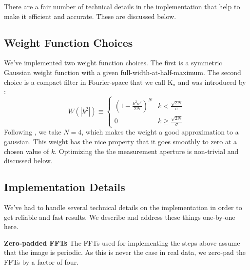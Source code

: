\documentclass[twocolappendix, appendixfloats, numberedappendix, twocolumn, apj]{openjournal}
\newcommand{\ksigma}{\mbox{\boldmath $\mathrm{K}_{\sigma}$}\xspace}
\begin{document}
There are a fair number of technical details in the implementation that help to make it efficient and
accurate. These are discussed below.

\subsection{Weight Function Choices}

We've implemented two weight function choices. The first is a symmetric Gaussian weight
function with a given full-width-at-half-maximum. The second choice is a compact filter
in Fourier-space that we call \ksigma and was introduced by \citet{BernBFD2016}:
\begin{equation}
\label{ksigma}
W\left(|k^2|\right)  \equiv \left\{
\begin{array}{cc}
\left( 1 - \frac{k^2\sigma^2}{2N}\right)^N & k <
                                             \frac{\sqrt{2N}}{\sigma} \\
0 & k \ge
                                             \frac{\sqrt{2N}}{\sigma}
\end{array}
\right.
\end{equation}
Following \citet{BernBFD2016}, we take $N = 4$, which makes the weight a good
approximation to a gaussian.  This weight has the nice property that it goes
smoothly to zero at a chosen value of $k$. Optimizing the the measurement aperture
is non-trivial and discussed below.

\subsection{Implementation Details}

We've had to handle several technical details on the implementation in order to get
reliable and fast results. We describe and address these things one-by-one here.

\textbf{Zero-padded FFTs} The FFTs used for implementing the steps above assume that
the image is periodic. As this is never the case in real data, we zero-pad the FFTs by a
factor of four.
\end{document}
